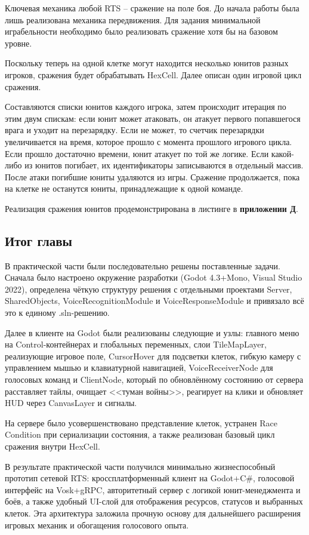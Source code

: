         Ключевая механика любой RTS -- сражение на поле боя. До начала работы была лишь реализована механика передвижения. Для задания минимальной
        играбельности необходимо было реализовать сражение хотя бы на базовом уровне.

        Поскольку теперь на одной клетке могут находится несколько юнитов разных игроков, сражения будет обрабатывать HexCell. Далее описан один игровой цикл сражения.
        
        Составляются списки юнитов каждого игрока, затем происходит итерация по этим двум спискам: если юнит может атаковать, он атакует первого попавшегося врага и уходит на перезарядку.
        Если не может, то счетчик перезарядки увеличивается на время, которое прошло с момента прошлого игрового цикла. Если прошло достаточно времени, юнит 
        атакует по той же логике. Если какой-либо из юнитов погибает, их идентификаторы записываются в отдельный массив. После атаки погибшие юниты удаляются из
        игры. Сражение продолжается, пока на клетке не останутся юниты, принадлежащие к одной команде.

        Реализация сражения юнитов продемонстрирована в листинге в \textbf{приложении Д}.
    \subsection{Итог главы}

    В практической части были последовательно решены поставленные задачи. 
    Сначала было настроено окружение разработки (Godot 4.3+Mono, Visual Studio 2022), определена чёткую структуру решения с отдельными 
    проектами Server, SharedObjects, VoiceRecognitionModule и VoiceResponseModule и привязало всё это к единому .sln-решению.

    Далее в клиенте на Godot были реализованы следующие и узлы: главного меню на Control-контейнерах и глобальных переменных, слои TileMapLayer, 
    реализующие игровое поле, CursorHover для подсветки клеток, гибкую камеру с управлением мышью и клавиатурной 
    навигацией, VoiceReceiverNode для голосовых команд и ClientNode, который по обновлённому состоянию от сервера расставляет 
    тайлы, очищает <<туман войны>>, реагирует на клики и обновляет HUD через CanvasLayer и сигналы.
    
    На сервере было усовершенствовано представление клеток, устранен Race Condition при сериализации состояния, 
    а также реализован базовый цикл сражения внутри HexCell.
    
    В результате практической части получился минимально жизнеспособный прототип сетевой RTS: кроссплатформенный клиент на Godot+C\#, голосовой 
    интерфейс на Vosk+gRPC, авторитетный сервер с логикой юнит-менеджмента и боёв, а также удобный UI-слой для отображения ресурсов, статусов и 
    выбранных клеток. Эта архитектура заложила прочную основу для дальнейшего расширения игровых механик и обогащения 
    голосового опыта.